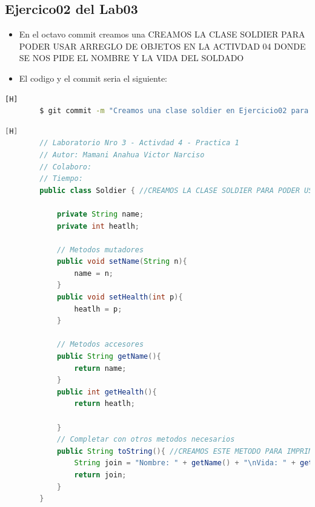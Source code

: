 \documentclass{article}
\begin{document}
	\subsection{Ejercico02 del Lab03}
	\begin{itemize}	
		\item En el octavo commit creamos una CREAMOS LA CLASE SOLDIER PARA PODER USAR ARREGLO DE OBJETOS EN LA ACTIVDAD 04 DONDE SE NOS PIDE EL NOMBRE Y LA VIDA DEL SOLDADO
		\item El codigo y el commit seria el siguiente:
	\end{itemize}
	\begin{lstlisting}[language=bash,caption={Commit}][H]
		$ git commit -m "Creamos una clase soldier en Ejercicio02 para poder usarla en la actividad04 del lab01 ya que nos pide usar arreglo de objetos donde cada soldado se le pide su nombre y su vida , tambien movimos los archivos DemoBatalla.java y Nave.java a una nueva carpeta"
	\end{lstlisting}
	\begin{lstlisting}[language=java,caption={Las lineas de codigo de lo creado:}][H]
		// Laboratorio Nro 3 - Activdad 4 - Practica 1
		// Autor: Mamani Anahua Victor Narciso
		// Colaboro:
		// Tiempo:
		public class Soldier { //CREAMOS LA CLASE SOLDIER PARA PODER USAR ARREGLO DE OBJETOS EN LA ACTIVDAD 04 DONDE SE NOS PIDE EL NOMBRE Y LA VIDA DEL SOLDADO  
		
			private String name;
			private int heatlh;
		
			// Metodos mutadores
			public void setName(String n){
				name = n;
			}
			public void setHealth(int p){
				heatlh = p;
			}
		
			// Metodos accesores
			public String getName(){
				return name;
			}
			public int getHealth(){
				return heatlh;
		
			}
			// Completar con otros metodos necesarios
			public String toString(){ //CREAMOS ESTE METODO PARA IMPRIMIR LOS DATOS DEl OBJETO
				String join = "Nombre: " + getName() + "\nVida: " + getHealth();
				return join;
			}
		}
	\end{lstlisting}
\end{document}
